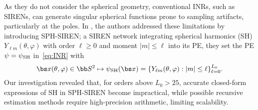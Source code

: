 As they do not consider the spherical geometry, conventional INRs, such as SIRENs, can generate singular spherical functions prone to sampling artifacts, particularly at the poles. In \cite{russwurm2024locationencoding}, the authors addressed these limitations by introducing SPH-SIREN; a SIREN network integrating spherical harmonics (SH) $Y_{\ell m}(\theta,\varphi)$ with order $\ell \geq 0$ and moment $|m|\leq \ell$ \cite{courant62} into its PE, \ie they set the PE $\psi = \psi_{\rm SH}$ in~\eqref{eq:INR} with
\begin{equation*}
\bs x(\theta, \varphi)\in \bb S^2 \mapsto \psi_{\rm SH}(\bs x) = \{ {Y}_{\ell m}(\theta, \varphi) : |m|\leq \ell\}_{\ell=0}^{L_0}.
\end{equation*}
Our investigation revealed that, for orders above $L_0>25$, accurate closed-form expressions of SH in SPH-SIREN become impractical, while possible recursive estimation methods require high-precision arithmetic, limiting scalability.